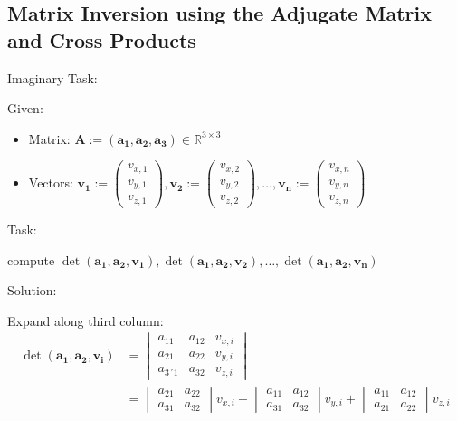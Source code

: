 \documentclass{article}
\newcommand{\R}{\mathbb{R}}
\newcommand{\vctr}[1]{\mathbf{#1}}
\newcommand{\mat}[1]{\mathbf{#1}}
\newcommand{\colvec}[1]{\begin{pmatrix}#1\end{pmatrix}}
\newcommand{\matCol}[1]{\vctr{a_{#1}}}
\begin{document}
\subsection{Matrix Inversion using the Adjugate Matrix and Cross Products}

Imaginary Task:

Given:
\begin{itemize}
\item Matrix: \(\mat{A} := (\matCol{1}, \matCol{2}, \matCol{3}) \in \R^{3\times 3}\)
\item Vectors: \(\vctr{v_1}:= \colvec{v_{x, 1} \\ v_{y, 1} \\ v_{z, 1}}, \vctr{v_2}:= \colvec{v_{x, 2} \\ v_{y, 2} \\ v_{z, 2}}, \dots, \vctr{v_n}:= \colvec{v_{x, n} \\ v_{y, n} \\ v_{z, n}}\)
\end{itemize}

Task:

compute \(\det(\matCol{1}, \matCol{2}, \vctr{v_1}), \det(\matCol{1}, \matCol{2}, \vctr{v_2}), \dots, \det(\matCol{1}, \matCol{2}, \vctr{v_n})\)

Solution:

Expand along third column:
\begin{align*}
\det(\matCol{1}, \matCol{2}, \vctr{v_i}) &= 
\begin{vmatrix}
a_{11} & a_{12} & v_{x, i} \\
a_{21} & a_{22} & v_{y, i} \\
a_{3´1} & a_{32} & v_{z, i}
\end{vmatrix} \\
&= \begin{vmatrix}
a_{21} & a_{22} \\
a_{31} & a_{32}
\end{vmatrix} v_{x, i}
- \begin{vmatrix}
a_{11} & a_{12} \\
a_{31} & a_{32}
\end{vmatrix} v_{y, i}
+ \begin{vmatrix}
a_{11} & a_{12} \\
a_{21} & a_{22}
\end{vmatrix} v_{z, i}
\end{align*}
\end{document}
